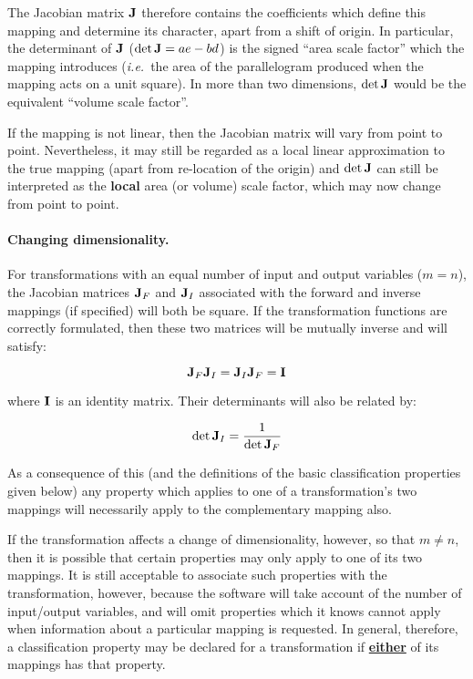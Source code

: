The Jacobian matrix ${\bf J}$ therefore contains the coefficients which
define this mapping and determine its character, apart from a shift of
origin. 
In particular, the determinant of ${\bf J}$ (\mbox{$\det{\bf J}=ae-bd$}) is
the signed ``area scale factor'' which the mapping introduces ({\em i.e.}\
the area of the parallelogram produced when the mapping acts on a unit
square). 
In more than two dimensions, $\det{\bf J}$ would be the equivalent ``volume
scale factor''. 

If the mapping is not linear, then the Jacobian matrix will vary from point to
point. 
Nevertheless, it may still be regarded as a local linear approximation to
the true mapping (apart from re-location of the origin) and \mbox{$\det {\bf
J}$} can still be interpreted as the {\bf local} area (or volume) scale
factor, which may now change from point to point. 

\paragraph{Changing dimensionality.}
For transformations with an equal number of input and output variables
(\mbox{$m=n$}), the Jacobian matrices ${\bf J}_F$ and ${\bf J}_I$ associated
with the forward and inverse mappings (if specified) will both be square. 
If the transformation functions are correctly formulated, then these two
matrices will be mutually inverse and will satisfy: 

\begin{equation}
{\bf J}_F {\bf J}_I = {\bf J}_I {\bf J}_F = {\bf I}
\end{equation}

where ${\bf I}$ is an identity matrix.
Their determinants will also be related by:

\begin{equation}
\det{{\bf J}_I} = \frac{1}{\det{{\bf J}_F}}
\end{equation}

As a consequence of this (and the definitions of the basic classification
properties given below) any property which applies to one of a
transformation's two mappings will necessarily apply to the complementary
mapping also. 

If the transformation affects a change of dimensionality, however, so that
\mbox{$m \ne n$}, then it is possible that certain properties may only apply
to one of its two mappings. 
It is still acceptable to associate such properties with the transformation,
however, because the \name{TRANSFORM} software will take account of the
number of input/output variables, and will omit properties which it knows
cannot apply when information about a particular mapping is requested. 
In general, therefore, a classification property may be declared for a
transformation if \underline{\bf either} of its mappings has that property. 


